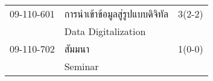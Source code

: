 \begin{longtable}{p{}p{}r{}}
09-110-601 & การนำเข้าข้อมูลสู่รูปแบบดิจิทัล & 3(2-2)\\
& Data Digitalization & \\[3mm]
09-110-702 & สัมมนา & 1(0-0)\\
& Seminar & \\[3mm]
\end{longtable}
